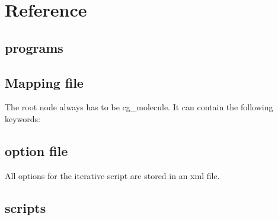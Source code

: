 \chapter{Reference}
\section{programs}

\section{Mapping file}
\label{sec:ref_mapping}
The root node always has to be cg\_molecule. It can contain the following keywords:



\section{option file}
All options for the iterative script are stored in an xml file.
\label{sec:ref_options}


\section{scripts}

